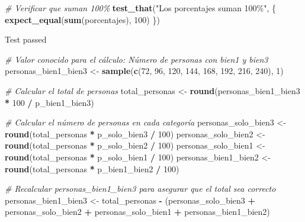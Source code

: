 \documentclass[
]{article}
\newenvironment{Shaded}{\begin{snugshade}}{\end{snugshade}}
\newcommand{\CommentTok}[1]{\textcolor[rgb]{0.56,0.35,0.01}{\textit{#1}}}
\newcommand{\DecValTok}[1]{\textcolor[rgb]{0.00,0.00,0.81}{#1}}
\newcommand{\FunctionTok}[1]{\textcolor[rgb]{0.13,0.29,0.53}{\textbf{#1}}}
\newcommand{\NormalTok}[1]{#1}
\newcommand{\OtherTok}[1]{\textcolor[rgb]{0.56,0.35,0.01}{#1}}
\newcommand{\SpecialCharTok}[1]{\textcolor[rgb]{0.81,0.36,0.00}{\textbf{#1}}}
\newcommand{\StringTok}[1]{\textcolor[rgb]{0.31,0.60,0.02}{#1}}
\begin{document}
\begin{Shaded}
\begin{Highlighting}[]
\CommentTok{\# Verificar que suman 100\%}
\FunctionTok{test\_that}\NormalTok{(}\StringTok{"Los porcentajes suman 100\%"}\NormalTok{, \{}
  \FunctionTok{expect\_equal}\NormalTok{(}\FunctionTok{sum}\NormalTok{(porcentajes), }\DecValTok{100}\NormalTok{)}
\NormalTok{\})}
\end{Highlighting}
\end{Shaded}

Test passed

\begin{Shaded}
\begin{Highlighting}[]
\CommentTok{\# Valor conocido para el cálculo: Número de personas con bien1 y bien3}
\NormalTok{personas\_bien1\_bien3 }\OtherTok{\textless{}{-}} \FunctionTok{sample}\NormalTok{(}\FunctionTok{c}\NormalTok{(}\DecValTok{72}\NormalTok{, }\DecValTok{96}\NormalTok{, }\DecValTok{120}\NormalTok{, }\DecValTok{144}\NormalTok{, }\DecValTok{168}\NormalTok{, }\DecValTok{192}\NormalTok{, }\DecValTok{216}\NormalTok{, }\DecValTok{240}\NormalTok{), }\DecValTok{1}\NormalTok{)}

\CommentTok{\# Calcular el total de personas}
\NormalTok{total\_personas }\OtherTok{\textless{}{-}} \FunctionTok{round}\NormalTok{(personas\_bien1\_bien3 }\SpecialCharTok{*} \DecValTok{100} \SpecialCharTok{/}\NormalTok{ p\_bien1\_bien3)}

\CommentTok{\# Calcular el número de personas en cada categoría}
\NormalTok{personas\_solo\_bien3 }\OtherTok{\textless{}{-}} \FunctionTok{round}\NormalTok{(total\_personas }\SpecialCharTok{*}\NormalTok{ p\_solo\_bien3 }\SpecialCharTok{/} \DecValTok{100}\NormalTok{)}
\NormalTok{personas\_solo\_bien2 }\OtherTok{\textless{}{-}} \FunctionTok{round}\NormalTok{(total\_personas }\SpecialCharTok{*}\NormalTok{ p\_solo\_bien2 }\SpecialCharTok{/} \DecValTok{100}\NormalTok{)}
\NormalTok{personas\_solo\_bien1 }\OtherTok{\textless{}{-}} \FunctionTok{round}\NormalTok{(total\_personas }\SpecialCharTok{*}\NormalTok{ p\_solo\_bien1 }\SpecialCharTok{/} \DecValTok{100}\NormalTok{)}
\NormalTok{personas\_bien1\_bien2 }\OtherTok{\textless{}{-}} \FunctionTok{round}\NormalTok{(total\_personas }\SpecialCharTok{*}\NormalTok{ p\_bien1\_bien2 }\SpecialCharTok{/} \DecValTok{100}\NormalTok{)}

\CommentTok{\# Recalcular personas\_bien1\_bien3 para asegurar que el total sea correcto}
\NormalTok{personas\_bien1\_bien3 }\OtherTok{\textless{}{-}}\NormalTok{ total\_personas }\SpecialCharTok{{-}}\NormalTok{ (personas\_solo\_bien3 }\SpecialCharTok{+}\NormalTok{ personas\_solo\_bien2 }\SpecialCharTok{+}\NormalTok{ personas\_solo\_bien1 }\SpecialCharTok{+}\NormalTok{ personas\_bien1\_bien2)}


\end{Highlighting}
\end{Shaded}
\end{document}
